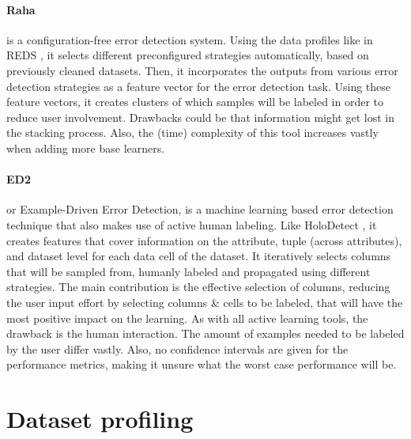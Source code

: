 \paragraph{Raha \cite{Mahdavi2019-zf}} is a configuration-free error detection system. Using the data profiles like in REDS \cite{Mahdavi2019-pk}, it selects different preconfigured strategies automatically, based on previously cleaned datasets. Then, it incorporates the outputs from various error detection strategies as a feature vector for the error detection task. 
Using these feature vectors, it creates clusters of which samples will be labeled in order to reduce user involvement. Drawbacks could be that information might get lost in the stacking process. Also, the (time) complexity of this tool increases vastly when adding more base learners.

\paragraph{ED2 \cite{Neutatz2019-aw}} or Example-Driven Error Detection, is a machine learning based error detection technique that also makes use of active human labeling. 
Like HoloDetect \cite{Heidari2019-ox}, it creates features that cover information on the attribute, tuple (across attributes), and dataset level for each data cell of the dataset. It iteratively selects columns that will be sampled from, humanly labeled and propagated using different strategies. The main contribution is the effective selection of columns, reducing the user input effort by selecting columns \& cells to be labeled, that will have the most positive impact on the learning. As with all active learning tools, the drawback is the human interaction. The amount of examples needed to be labeled by the user differ vastly. Also, no confidence intervals are given for the performance metrics, making it unsure what the worst case performance will be. 


\section{Dataset profiling}




